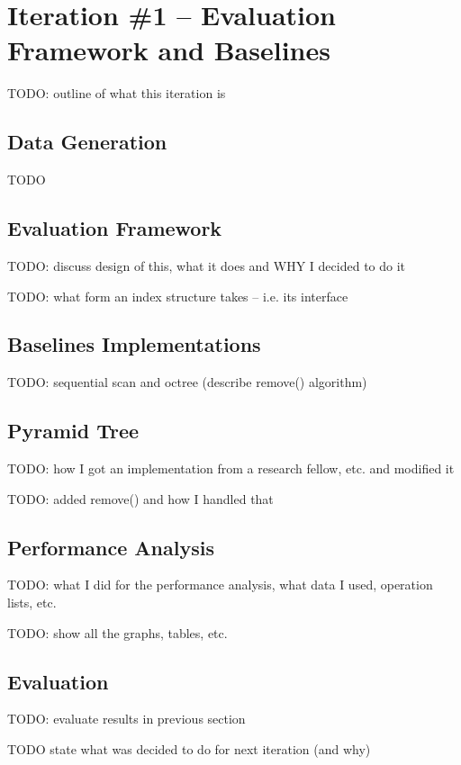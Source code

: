 \section{Iteration \#1 -- Evaluation Framework and Baselines}

TODO: outline of what this iteration is

\subsection{Data Generation}

TODO

\subsection{Evaluation Framework}

TODO: discuss design of this, what it does and WHY I decided to do it

TODO: what form an index structure takes -- i.e. its interface

\subsection{Baselines Implementations}

TODO: sequential scan and octree (describe remove() algorithm)

\subsection{Pyramid Tree}

TODO: how I got an implementation from a research fellow, etc. and modified it

TODO: added remove() and how I handled that

\subsection{Performance Analysis}

TODO: what I did for the performance analysis, what data I used, operation lists, etc.

TODO: show all the graphs, tables, etc.

\subsection{Evaluation}

TODO: evaluate results in previous section

TODO state what was decided to do for next iteration (and why)
